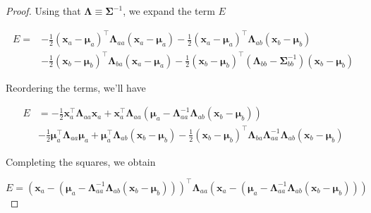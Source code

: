 \begin{appendices}
\begin{proof}
    Using that $\boldsymbol{\Lambda} \equiv \boldsymbol{\Sigma}^{-1}$, we expand the term $E$

    \begin{align}
      E = &-\frac{1}{2}\left(\mathbf{x}_{a}-\boldsymbol{\mu}_{a}\right)^\top \boldsymbol{\Lambda}_{a a}\left(\mathbf{x}_{a}-\boldsymbol{\mu}_{a}\right)-\frac{1}{2}\left(\mathbf{x}_{a}-\boldsymbol{\mu}_{a}\right)^\top \boldsymbol{\Lambda}_{a b}\left(\mathbf{x}_{b}-\boldsymbol{\mu}_{b}\right) \\ &-\frac{1}{2}\left(\mathbf{x}_{b}-\boldsymbol{\mu}_{b}\right)^\top \boldsymbol{\Lambda}_{b a}\left(\mathbf{x}_{a}-\boldsymbol{\mu}_{a}\right)-\frac{1}{2}\left(\mathbf{x}_{b}-\boldsymbol{\mu}_{b}\right)^\top \left( \boldsymbol{\Lambda}_{b b} - \boldsymbol{\Sigma}_{bb}^{-1} \right)\left(\mathbf{x}_{b}-\boldsymbol{\mu}_{b}\right) 
    \end{align}

    Reordering the terms, we'll have

    \begin{equation}
    \begin{aligned} E &=-\frac{1}{2} \mathbf{x}_{a}^\top \boldsymbol{\Lambda}_{a a} \mathbf{x}_{a}+\mathbf{x}_{a}^\top \boldsymbol{\Lambda}_{a a} \left(\boldsymbol{\mu}_{a}-\boldsymbol{\Lambda}_{a a}^{-1}\boldsymbol{\Lambda}_{a b}\left(\mathbf{x}_{b}-\boldsymbol{\mu}_{b}\right)\right) \\ &-\frac{1}{2} \boldsymbol{\mu}_{a}^\top \boldsymbol{\Lambda}_{a a} \boldsymbol{\mu}_{a}+\boldsymbol{\mu}_{a}^\top \boldsymbol{\Lambda}_{a b}\left(\mathbf{x}_{b}-\boldsymbol{\mu}_{b}\right)-\frac{1}{2}\left(\mathbf{x}_{b}-\boldsymbol{\mu}_{b}\right)^\top \boldsymbol{\Lambda}_{b a} \boldsymbol{\Lambda}_{a a}^{-1} \boldsymbol{\Lambda}_{a b}\left(\mathbf{x}_{b}-\boldsymbol{\mu}_{b}\right) \end{aligned}
    \end{equation}

    Completing the squares, we obtain

    \begin{equation}
      E = \left( \mathbf{x}_a - \left( \boldsymbol{\mu}_{a}-\boldsymbol{\Lambda}_{a a}^{-1}\boldsymbol{\Lambda}_{a b}\left(\mathbf{x}_{b}-\boldsymbol{\mu}_{b}\right)  \right) \right)^\top \boldsymbol{\Lambda}_{a a} \left( \mathbf{x}_a - \left( \boldsymbol{\mu}_{a}-\boldsymbol{\Lambda}_{a a}^{-1}\boldsymbol{\Lambda}_{a b}\left(\mathbf{x}_{b}-\boldsymbol{\mu}_{b}\right)  \right) \right)
    \end{equation}


\end{proof}
\end{appendices}
